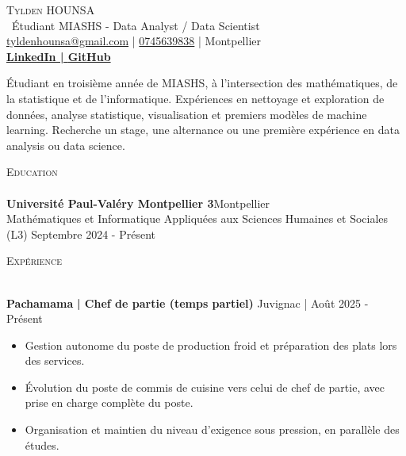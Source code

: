 \documentclass[a4paper]{article}
\newcommand{\lineunder} {
    \vspace*{-8pt} \\
    \hspace*{-18pt} \hrulefill \\
}
\newcommand{\header} [1] {
    {\hspace*{-18pt}\vspace*{6pt} \textsc{#1}}
    \vspace*{-6pt} \lineunder
}
\begin{document}
    \vspace*{-40pt}

    

%
%
  \vspace*{-2pt}
  \begin{center}
    {\Huge \scshape {Tylden HOUNSA}}\\
    \vspace*{2pt}
    \ {Étudiant MIASHS - Data Analyst / Data Scientist}\\
    \vspace*{2pt}
    \href{mailto:tyldenhounsa@gmail.com}{tyldenhounsa@gmail.com} | \href{tel:0745639838}{0745639838} | Montpellier\\
    \vspace*{2pt}
        \textbf{\href{https://www.linkedin.com/in/tylden-hounsa-b14559349}{LinkedIn | }}\textbf{\href{https://github.com/Ashborn539}{GitHub}}\\
  \end{center}

    \vspace{1mm}
    Étudiant en troisième année de MIASHS, à l'intersection des mathématiques, de la statistique et de l'informatique. Expériences en nettoyage et exploration de données, analyse statistique, visualisation et premiers modèles de machine learning. Recherche un stage, une alternance ou une première expérience en data analysis ou data science.



      \header{Education}
      \vspace{2mm}
    \textbf{Université Paul-Valéry Montpellier 3}\hfill Montpellier\\
Mathématiques et Informatique Appliquées aux Sciences Humaines et Sociales (L3) \hfill Septembre 2024 - Présent\\

\vspace{2mm}

      \header{Expérience}
      \vspace{2mm}


    \textbf{Pachamama}\textbf{ | Chef de partie (temps partiel)} \hfill Juvignac | Août 2025 - Présent\\
          \vspace{-3mm}
\begin{itemize} \itemsep -3pt
\item  Gestion autonome du poste de production froid et préparation des plats lors des services.
\item  Évolution du poste de commis de cuisine vers celui de chef de partie, avec prise en charge complète du poste.
\item  Organisation et maintien du niveau d'exigence sous pression, en parallèle des études.
\end{itemize}
\end{document}
